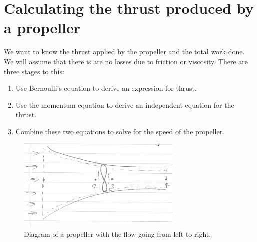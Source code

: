 \documentclass[class=report, crop=false, 12pt,a4paper]{standalone}
\begin{document}
\section{Calculating the thrust produced by \\ a propeller}
We want to know the thrust applied by the propeller and the total work done. We will assume that there is are no losses due to friction or viscosity. There are three stages to this: 
\begin{enumerate}[noitemsep]
  \item Use Bernoulli's equation to derive an expression for thrust.
  \item Use the momentum equation to derive an independent equation for the thrust.
  \item Combine these two equations to solve for the speed of the propeller.
\end{enumerate}
\begin{figure}
  \centering
  \includegraphics[width = 0.7\textwidth]{../img/PropDiagram}
  \caption{Diagram of a propeller with the flow going from left to right.}
\end{figure}
\end{document}
